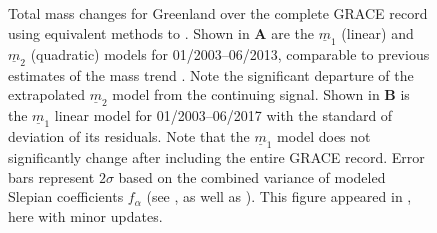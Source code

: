 \documentclass[11pt]{report}
\begin{document}
\begin{figure}[h!]
\centering
{}
\caption[Greenland Mass Trend: 2003--2017]{Total mass changes for Greenland over the complete GRACE record using equivalent methods to \cite{Harig+2016}. Shown in \textbf{A} are the $\underline{m}_1$ (linear) and $\underline{m}_2$ (quadratic) models for 01/2003--06/2013, comparable to previous estimates of the mass trend \citep{Harig+2016}. Note the significant departure of the extrapolated $\underline{m}_2$ model from the continuing signal. Shown in \textbf{B} is the $\underline{m}_1$ linear model for 01/2003--06/2017 with the standard of deviation of its residuals. Note that the $\underline{m}_1$ model does not significantly change after including the entire GRACE record. Error bars represent $2\sigma$ based on the combined variance of modeled Slepian coefficients $f_{\alpha}$ (see \cite{Harig+2016}, as well as \cite{getraerFall,getraerSpring}). This figure appeared in \cite{getraerFall,getraerSpring}, here with minor updates.} \label{fig:Getraer}
\end{figure}
\end{document}
